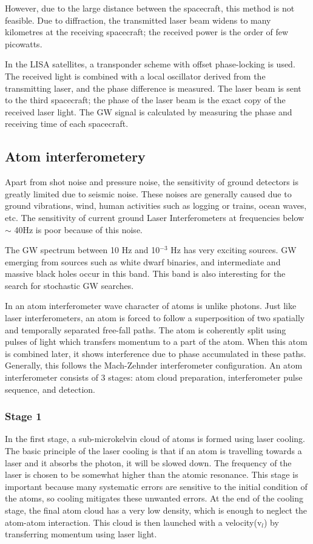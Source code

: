 \documentclass[conference]{IEEEtran}
\begin{document}
However, due to the large distance between the spacecraft, this method is not feasible. Due to diffraction, the transmitted laser beam widens to many kilometres at the receiving spacecraft; the received power is the order of few picowatts\cite{Jennrich_2009,article7}.

In the LISA satellites, a transponder scheme with offset phase-locking is used. The received light is combined with a local oscillator derived from the transmitting laser, and the phase difference is measured. The laser beam is sent to the third spacecraft; the phase of the laser beam is the exact copy of the received laser light. The GW signal is calculated by measuring the phase and receiving time of each spacecraft\cite{Danzmann_1996}.


\subsection{Atom interferometery}
Apart from shot noise and pressure noise, the sensitivity of ground detectors is greatly limited due to seismic noise. These noises are generally caused due to ground vibrations, wind, human activities such as logging or trains, ocean waves, etc. The sensitivity of current ground Laser Interferometers at frequencies below $\sim$ 40Hz is poor because of this noise. 

The GW spectrum between 10 Hz and 10$^{-3}$ Hz has very exciting sources. GW emerging from sources such as white dwarf binaries, and intermediate and massive black holes occur in this band. This band is also interesting for the search for stochastic GW searches\cite{Dimopoulos_2008}.


In an atom interferometer wave character of atoms is unlike photons. Just like laser interferometers, an atom is forced to follow a superposition of two spatially and temporally separated free-fall paths. The atom is coherently split using pulses of light which transfers momentum to a part of the atom. When this atom is combined later, it shows interference due to phase accumulated in these paths. Generally, this follows the Mach-Zehnder interferometer configuration. An atom interferometer consists of 3 stages: atom cloud preparation, interferometer pulse sequence, and detection.

\subsubsection{Stage 1}
In the first stage, a sub-microkelvin cloud of atoms is formed using laser cooling. The basic principle of the laser cooling is that if an atom is travelling towards a laser and it absorbs the photon, it will be slowed down. The frequency of the laser is chosen to be somewhat higher than the atomic resonance. This stage is important because many systematic errors are sensitive to the initial condition of the atoms, so cooling mitigates these unwanted errors. At the end of the cooling stage, the final atom cloud has a very low density, which is enough to neglect the atom-atom interaction. This cloud is then launched with a velocity(v$_{l}$) by transferring momentum using laser light.
\end{document}
